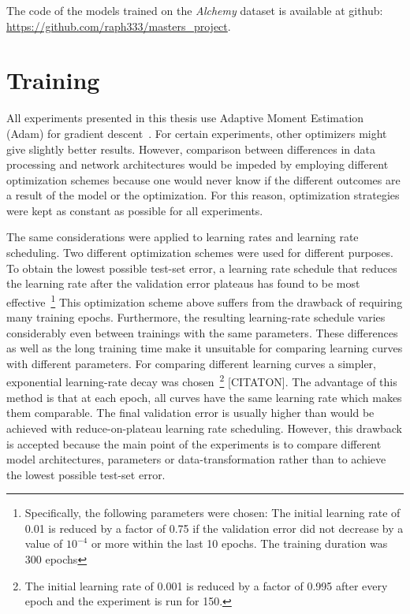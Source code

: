 The code of the models trained on the \textit{Alchemy} dataset is available at github: \url{https://github.com/raph333/masters\_project}.



\section{Training}
\label{sec:training}

All experiments presented in this thesis use Adaptive Moment Estimation (Adam) for gradient descent~\cite{Kingma2015}. For certain experiments, other optimizers might give slightly better results. However, comparison between differences in data processing and network architectures would be impeded by employing different optimization schemes because one would never know if the different outcomes are a result of the model or the optimization. For this reason, optimization strategies were kept as constant as possible for all experiments.

The same considerations were applied to learning rates and learning rate scheduling. Two different optimization schemes were used for different purposes.
To obtain the lowest possible test-set error, a learning rate schedule that reduces the learning rate after the validation error plateaus has found to be most effective~\footnote{Specifically, the following parameters were chosen: The initial learning rate of 0.01 is reduced by a factor of 0.75 if the validation error did not decrease by a value of $10^{-4}$ or more within the last 10 epochs. The training duration was 300 epochs} This optimization scheme above suffers from the drawback of requiring many training epochs. Furthermore, the resulting learning-rate schedule varies considerably even between trainings with the same parameters. These differences as well as the long training time make it unsuitable for comparing learning curves with different parameters.
For comparing different learning curves a simpler, exponential learning-rate decay was chosen~\footnote{The initial learning rate of 0.001 is reduced by a factor of 0.995 after every epoch and the experiment is run for 150.} [CITATON]. The advantage of this method is that at each epoch, all curves have the same learning rate which makes them comparable. The final validation error is usually higher than would be achieved with reduce-on-plateau learning rate scheduling. However, this drawback is accepted because the main point of the experiments is to compare different model architectures, parameters or data-transformation rather than to achieve the lowest possible test-set error.


